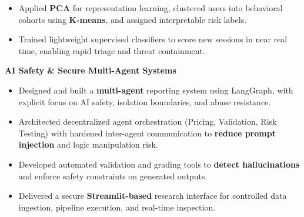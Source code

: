 \begin{cventries}
{\begin{cvitems}
\begin{itemize}
{          }
          \item {
            Applied \textbf{PCA} for representation learning, 
            clustered users into behavioral cohorts using \textbf{K-means}, and assigned interpretable risk labels.
          }
          \item {
            Trained lightweight supervised classifiers to score new sessions in near real time, 
            enabling rapid triage and threat containment.
          }
        \end{itemize}
      \vspace{0.5mm}
      \item {\textbf{AI Safety \& Secure Multi-Agent Systems}}
        \begin{itemize}
          \item {
            Designed and built a \textbf{multi-agent} reporting system using LangGraph, 
            with explicit focus on AI safety, isolation boundaries, and abuse resistance.
          }
          \item {
            Architected decentralized agent orchestration (Pricing, Validation, Risk Testing) 
            with hardened inter-agent communication to \textbf{reduce prompt injection} and logic manipulation risk.
          }
          \item {
            Developed automated validation and grading tools to \textbf{detect hallucinations} and 
            enforce safety constraints on generated outputs.
          }
          \item {
            Delivered a secure \textbf{Streamlit-based} research interface for controlled data ingestion, 
            pipeline execution, and real-time inspection.
          }
        \end{itemize}
    \end{cvitems}
  }



\end{cventries}
